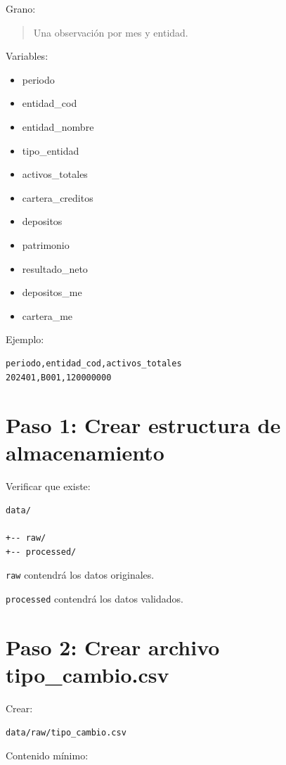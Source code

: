 Grano:

\begin{quote}
Una observación por mes y entidad.
\end{quote}

Variables:

\begin{itemize}
\item periodo
\item entidad\_cod
\item entidad\_nombre
\item tipo\_entidad
\item activos\_totales
\item cartera\_creditos
\item depositos
\item patrimonio
\item resultado\_neto
\item depositos\_me
\item cartera\_me
\end{itemize}

Ejemplo:

\begin{verbatim}
periodo,entidad_cod,activos_totales
202401,B001,120000000
\end{verbatim}

\section{Paso 1: Crear estructura de almacenamiento}

Verificar que existe:

\begin{verbatim}
data/

+-- raw/
+-- processed/
\end{verbatim}

\texttt{raw} contendrá los datos originales.

\texttt{processed} contendrá los datos validados.

\section{Paso 2: Crear archivo tipo\_cambio.csv}

Crear:

\begin{verbatim}
data/raw/tipo_cambio.csv
\end{verbatim}

Contenido mínimo:


